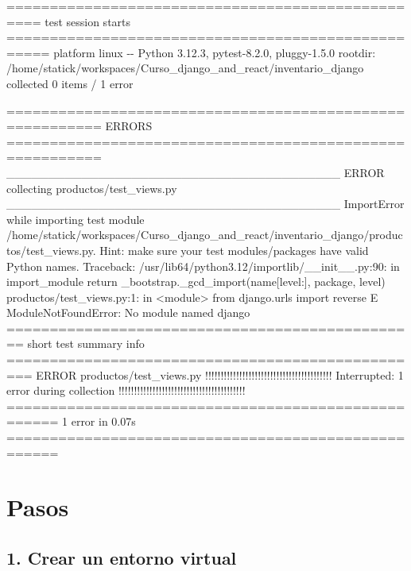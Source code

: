 \documentclass[
  a4paper,
  DIV=11,
  numbers=noendperiod,
  onepage,
  openany]{scrreprt}
\newenvironment{Shaded}{\begin{snugshade}}{\end{snugshade}}
\newcommand{\NormalTok}[1]{\textcolor[rgb]{0.00,0.23,0.31}{#1}}
\begin{document}
\begin{Shaded}
\begin{Highlighting}[]
\NormalTok{================================================== test session starts ===================================================}
\NormalTok{platform linux {-}{-} Python 3.12.3, pytest{-}8.2.0, pluggy{-}1.5.0}
\NormalTok{rootdir: /home/statick/workspaces/Curso\_django\_and\_react/inventario\_django}
\NormalTok{collected 0 items / 1 error                                                                                              }

\NormalTok{========================================================= ERRORS =========================================================}
\NormalTok{\_\_\_\_\_\_\_\_\_\_\_\_\_\_\_\_\_\_\_\_\_\_\_\_\_\_\_\_\_\_\_\_\_\_\_\_\_\_\_\_ ERROR collecting productos/test\_views.py \_\_\_\_\_\_\_\_\_\_\_\_\_\_\_\_\_\_\_\_\_\_\_\_\_\_\_\_\_\_\_\_\_\_\_\_\_\_\_\_}
\NormalTok{ImportError while importing test module \textquotesingle{}/home/statick/workspaces/Curso\_django\_and\_react/inventario\_django/productos/test\_views.py\textquotesingle{}.}
\NormalTok{Hint: make sure your test modules/packages have valid Python names.}
\NormalTok{Traceback:}
\NormalTok{/usr/lib64/python3.12/importlib/\_\_init\_\_.py:90: in import\_module}
\NormalTok{    return \_bootstrap.\_gcd\_import(name[level:], package, level)}
\NormalTok{productos/test\_views.py:1: in \textless{}module\textgreater{}}
\NormalTok{    from django.urls import reverse}
\NormalTok{E   ModuleNotFoundError: No module named \textquotesingle{}django\textquotesingle{}}
\NormalTok{================================================ short test summary info =================================================}
\NormalTok{ERROR productos/test\_views.py}
\NormalTok{!!!!!!!!!!!!!!!!!!!!!!!!!!!!!!!!!!!!!!!!! Interrupted: 1 error during collection !!!!!!!!!!!!!!!!!!!!!!!!!!!!!!!!!!!!!!!!!}
\NormalTok{==================================================== 1 error in 0.07s ====================================================}
\end{Highlighting}
\end{Shaded}

\section{Pasos}\label{pasos}

\subsection{1. Crear un entorno
virtual}\label{crear-un-entorno-virtual-2}
\end{document}
